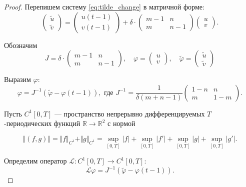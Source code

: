 \begin{proof}
	Перепишем систему \eqref{eq:tilde_change} в матричной форме:
	\[
	\begin{pmatrix}
		\tilde{u}\\
		\tilde{v}
	\end{pmatrix} = 
	\begin{pmatrix}
		u(t - 1)\\
		v(t - 1)
	\end{pmatrix} +
	\delta \cdot
	\begin{pmatrix}
		m - 1 & n \\
		m & n - 1
	\end{pmatrix}
	\begin{pmatrix}
		u\\
		v
	\end{pmatrix}.
	\]
	
	Обозначим
	\[
	J = 
	\delta \cdot
	\begin{pmatrix}
		m - 1 & n \\
		m & n - 1
	\end{pmatrix}, \quad
	\varphi =
	\begin{pmatrix}
		u\\
		v
	\end{pmatrix}, \quad
	\tilde{\varphi} =
	\begin{pmatrix}
		\tilde{u}\\
		\tilde{v}
	\end{pmatrix}
	\]
	
	Выразим $\varphi$:
	\begin{equation}
		\label{eq:tilde_matrix_form}
		\varphi = 
		J^{-1}
		\left(
		\tilde{\varphi} -
		\varphi(t - 1)
		\right),
		\text{ где }
		J^{-1} = \dfrac{1}{\delta(m + n - 1)} 
		\begin{pmatrix}
			1 - n & n \\
			m & 1 - m
		\end{pmatrix}.
	\end{equation}
	
	Пусть $C^1[0, T]$ --- пространство непрерывно дифференцируемых $T$-периодических функций $\mathbb{R} \to \mathbb{R}^2$ с нормой
	
	\[\Vert (f, g) \Vert = \Vert f \Vert_{C^1} + \Vert g \Vert_{C^1} = \sup\limits_{[0, T]} |f| + \sup\limits_{[0, T]} |f'| + \sup\limits_{[0, T]} |g| + \sup\limits_{[0, T]} |g'|.\]
	
	Определим оператор $\mathcal{L}:C^1[0, T] \to C^1[0, T]$:
	\[\mathcal{L}\varphi = J^{-1} \left(\tilde{\varphi} - \varphi(t - 1) \right).\]
	

\end{proof}

